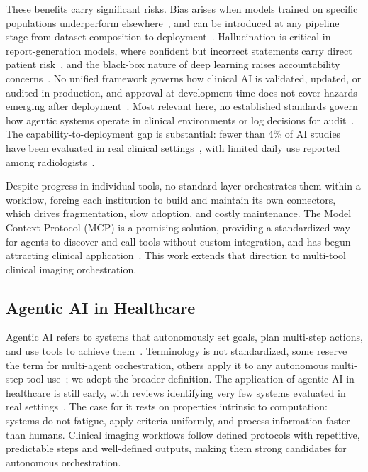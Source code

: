 \documentclass[preprint,12pt]{elsarticle}
\begin{document}
These benefits carry significant risks. Bias arises when models trained on specific populations underperform elsewhere~\cite{mittermaier2023bias}, and can be introduced at any pipeline stage from dataset composition to deployment~\cite{kocak2025bias}. Hallucination is critical in report-generation models, where confident but incorrect statements carry direct patient risk~\cite{griot2025metacognition}, and the black-box nature of deep learning raises accountability concerns~\cite{kondylakis2026futureai}. No unified framework governs how clinical AI is validated, updated, or audited in production, and approval at development time does not cover hazards emerging after deployment~\cite{jia2025deployment}. Most relevant here, no established standards govern how agentic systems operate in clinical environments or log decisions for audit~\cite{trustworthyai2025}. The capability-to-deployment gap is substantial: fewer than 4\% of AI studies have been evaluated in real clinical settings~\cite{cozzolino2025surveillance}, with limited daily use reported among radiologists~\cite{kondylakis2026futureai, ce2024perceptions}.

Despite progress in individual tools, no standard layer orchestrates them within a workflow, forcing each institution to build and maintain its own connectors, which drives fragmentation, slow adoption, and costly maintenance. The Model Context Protocol (MCP) is a promising solution, providing a standardized way for agents to discover and call tools without custom integration, and has begun attracting clinical application~\cite{transformingclinical2026, kalathas2026mcp, ehtesham2025mcpfhir}. This work extends that direction to multi-tool clinical imaging orchestration.

\subsection{Agentic AI in Healthcare}
Agentic AI refers to systems that autonomously set goals, plan multi-step actions, and use tools to achieve them~\cite{collaco2026scoping}. Terminology is not standardized, some reserve the term for multi-agent orchestration, others apply it to any autonomous multi-step tool use~\cite{abouali2026survey}; we adopt the broader definition. The application of agentic AI in healthcare is still early, with reviews identifying very few systems evaluated in real settings~\cite{collaco2026scoping, dietrich2025agentic, chen2025autonomous}. The case for it rests on properties intrinsic to computation: systems do not fatigue, apply criteria uniformly, and process information faster than humans. Clinical imaging workflows follow defined protocols with repetitive, predictable steps and well-defined outputs, making them strong candidates for autonomous orchestration.
\end{document}
